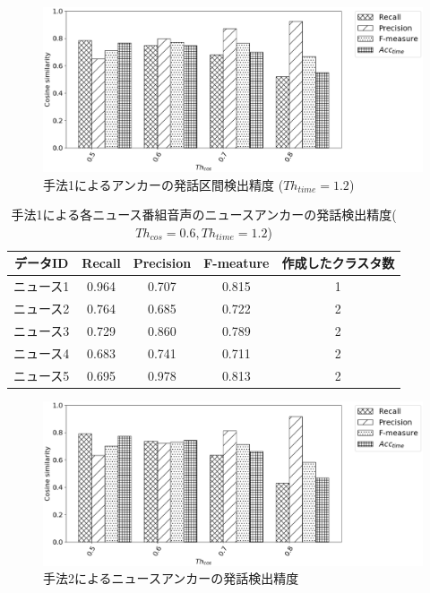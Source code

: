 \begin{figure}[H]
  \begin{center}
    \includegraphics[scale=0.5]{./figure/prob1_12.eps}
  \end{center}
  \caption{手法1によるアンカーの発話区間検出精度 ($Th_{time}=1.2$) \label{fig:result_anchor_prob1}}
\end{figure}

\begin{table}[H]
  \begin{center}
    \caption{手法1による各ニュース番組音声のニュースアンカーの発話検出精度($Th_{cos}=0.6,Th_{time}=1.2$) }
    \begin{tabular}{|c||c|c|c|c|} \hline
データID & Recall & Precision & F-meature & 作成したクラスタ数\\ \hline
ニュース1 & 0.964 & 0.707 & 0.815 & 1 \\ \hline
ニュース2 & 0.764 & 0.685 & 0.722 & 2 \\ \hline
ニュース3 & 0.729 & 0.860 & 0.789 & 2 \\ \hline
ニュース4 & 0.683 & 0.741 & 0.711 & 2 \\ \hline
ニュース5 & 0.695 & 0.978 & 0.813 & 2 \\ \hline
    \end{tabular}
  \end{center}
\end{table}

\begin{figure}[H]
  \begin{center}
    \includegraphics[scale=0.5]{./figure/prob2.eps}
  \end{center}
  \caption{手法2によるニュースアンカーの発話検出精度 \label{fig:result_anchor_prob2}}
\end{figure}

